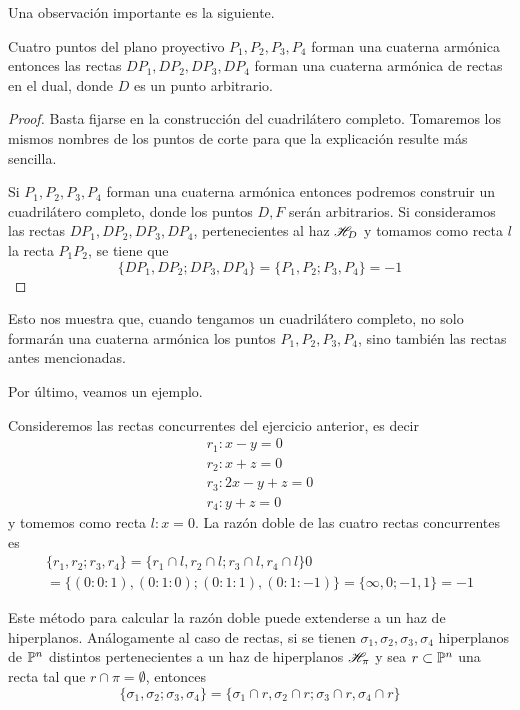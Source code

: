 Una observación importante es la siguiente.
\begin{lem}
	Cuatro puntos del plano proyectivo $P_1,P_2,P_3,P_4$ forman una cuaterna armónica entonces las rectas $DP_1,DP_2,DP_3,DP_4$ forman una cuaterna armónica de rectas en el dual, donde $D$ es un punto arbitrario.
\end{lem}
\begin{proof}
	Basta fijarse en la construcción del cuadrilátero completo. Tomaremos los mismos nombres de los puntos de corte para que la explicación resulte más sencilla.
	
	Si $P_1,P_2,P_3,P_4$ forman una cuaterna armónica entonces podremos construir un cuadrilátero completo, donde los puntos $D,F$ serán arbitrarios. Si consideramos las rectas $DP_1,DP_2,DP_3,DP_4$, pertenecientes al haz $\mathscr{H}_D$ y tomamos como recta $l$ la recta $P_1P_2$, se tiene que
	\[\{DP_1,DP_2;DP_3,DP_4\}=\{P_1,P_2;P_3,P_4\}=-1\]
\end{proof}
Esto nos muestra que, cuando tengamos un cuadrilátero completo, no solo formarán una cuaterna armónica los puntos $P_1,P_2,P_3,P_4$, sino también las rectas antes mencionadas.

Por último, veamos un ejemplo.
\begin{exa}
	Consideremos las rectas concurrentes del ejercicio anterior, es decir
	\[\begin{array}{c}
	r_1:x-y=0\\
	r_2:x+z=0\\
	r_3:2x-y+z=0\\
	r_4:y+z=0
	\end{array}\]
	y tomemos como recta $l:x=0$. La razón doble de las cuatro rectas concurrentes es
	 \begin{multline*}
	 	\{r_1,r_2;r_3,r_4\}=\{r_1\cap l,r_2\cap l;r_3\cap l,r_4\cap l\}0\\
	 	=\{(0:0:1),(0:1:0);(0:1:1),(0:1:-1)\}=\{\infty, 0; -1,1\}=-1
	 \end{multline*}
\end{exa}
Este método para calcular la razón doble puede extenderse a un haz de hiperplanos. Análogamente al caso de rectas, si se tienen $\sigma_1,\sigma_2,\sigma_3,\sigma_4$ hiperplanos de $\mathbb{P}^n$ distintos pertenecientes a un haz de hiperplanos $\mathscr{H}_\pi$ y sea $r\subset\mathbb{P}^n$ una recta tal que $r\cap\pi=\emptyset$, entonces
\begin{equation}
	\{\sigma_1,\sigma_2;\sigma_3,\sigma_4\}=\{\sigma_1\cap r,\sigma_2\cap r;\sigma_3\cap r,\sigma_4\cap r\}
\end{equation} 